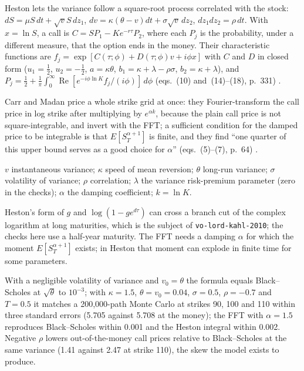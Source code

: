 \begin{qfmodel}\label{mod:heston-stochastic-volatility}
 Heston lets the variance follow a square-root process correlated with the stock: $dS=\mu S\,dt+\sqrt{v}S\,dz_1$, $dv=\kappa(\theta-v)dt+\sigma\sqrt v\,dz_2$, $dz_1dz_2=\rho\,dt$. With $x=\ln S$, a call is $C=SP_1-Ke^{-r\tau}P_2$, where each $P_j$ is the probability, under a different measure, that the option ends in the money. Their characteristic functions are $f_j=\exp[C(\tau;\phi)+D(\tau;\phi)v+i\phi x]$ with $C$ and $D$ in closed form ($u_1=\tfrac12$, $u_2=-\tfrac12$, $a=\kappa\theta$, $b_1=\kappa+\lambda-\rho\sigma$, $b_2=\kappa+\lambda$), and $P_j=\tfrac12+\tfrac1\pi\int_0^\infty\operatorname{Re}[e^{-i\phi\ln K}f_j/(i\phi)]\,d\phi$ (eqs.~(10) and~(14)--(18), p.~331) \citep[\emph{RFS} 6(2), 1993, eqs.~(10)--(18), pp.~330--331]{s6-heston}.

Carr and Madan price a whole strike grid at once: they Fourier-transform the call price in log strike after multiplying by $e^{\alpha k}$, because the plain call price is not square-integrable, and invert with the FFT; a sufficient condition for the damped price to be integrable is that $E[S_T^{\alpha+1}]$ is finite, and they find ``one quarter of this upper bound serves as a good choice for $\alpha$'' (eqs.~(5)--(7), p.~64) \citep[\emph{Journal of Computational Finance} 2(4), 1999, author copy, pp.~63--64]{s6-carrmadan}.

 $v$ instantaneous variance; $\kappa$ speed of mean reversion; $\theta$ long-run variance; $\sigma$ volatility of variance; $\rho$ correlation; $\lambda$ the variance risk-premium parameter (zero in the checks); $\alpha$ the damping coefficient; $k=\ln K$.

 Heston's form of $g$ and $\log(1-ge^{d\tau})$ can cross a branch cut of the complex logarithm at long maturities, which is the subject of \nolinkurl{vo-lord-kahl-2010}; the checks here use a half-year maturity. The FFT needs a damping $\alpha$ for which the moment $E[S_T^{\alpha+1}]$ exists; in Heston that moment can explode in finite time for some parameters.

 With a negligible volatility of variance and $v_0=\theta$ the formula equals Black--Scholes at $\sqrt\theta$ to $10^{-3}$; with $\kappa=1.5$, $\theta=v_0=0.04$, $\sigma=0.5$, $\rho=-0.7$ and $T=0.5$ it matches a 200{,}000-path Monte Carlo at strikes 90, 100 and 110 within three standard errors (5.705 against 5.708 at the money); the FFT with $\alpha=1.5$ reproduces Black--Scholes within 0.001 and the Heston integral within 0.002. Negative $\rho$ lowers out-of-the-money call prices relative to Black--Scholes at the same variance (1.41 against 2.47 at strike 110), the skew the model exists to produce.


\end{qfmodel}
